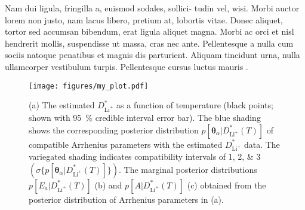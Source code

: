 \documentclass[reprint,superscriptaddress,nobibnotes,amsmath,amssymb,aps,hidelinks]{revtex4-2}
\begin{document}
Nam dui ligula, fringilla a, euismod sodales, sollici- tudin vel, wisi.
Morbi auctor lorem non justo, nam lacus libero, pretium at, lobortis vitae.
Donec aliquet, tortor sed accumsan bibendum, erat ligula aliquet magna.
Morbi ac orci et nisl hendrerit mollis, suspendisse ut massa, cras nec ante.
Pellentesque a nulla cum sociis natoque penatibus et magnis dis parturient.
Aliquam tincidunt urna, nulla ullamcorper vestibulum turpis.
Pellentesque cursus luctus mauris \citep{Luger2021}.

%
\begin{figure}
    \centering
    \texttt{[image: figures/my\_plot.pdf]}
    \caption{(a) The estimated $D^{*}_{\mathrm{Li^+}}$ as a function of temperature (black points; shown with \SI{95}{\percent} credible interval error bar). The blue shading shows the corresponding posterior distribution $p[\bm{\theta}_{\alpha} | D^{*}_{\mathrm{Li^+}}(T)]$ of compatible Arrhenius parameters with the estimated $D^*_{\mathrm{Li^+}}$ data. The variegated shading indicates compatibility intervals of \numlist{1;2;3} $(\sigma\{p[\bm{\theta}_{\alpha} | D^{*}_{\mathrm{Li^+}}(T)]\})$. The marginal posterior distributions $p[E_a | D^*_{\mathrm{Li^+}}(T)]$ (b) and $p[A | D^{*}_{\mathrm{Li^+}}(T)]$ (c) obtained from the posterior distribution of Arrhenius parameters in (a).}
    \label{fig:my_plot}
\end{figure}
%


\end{document}
